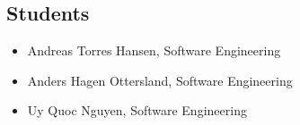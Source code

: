 \subsection{Students}
\begin{itemize}
	\item[] Andreas Torres Hansen, Software Engineering
	\item[] Anders Hagen Ottersland, Software Engineering
	\item[] Uy Quoc Nguyen, Software Engineering
\end{itemize}